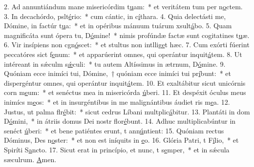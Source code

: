 2. Ad annuntiándum mane misericórdim t\uline{u}am:~* et veritátem tum per n\uline{o}ctem.
3. In decachórdo, pslt\uline{é}rio:~* cum cántic, in c\uline{í}thara.
4. Quia delectásti me, Dómine, in factúr t\uline{u}a:~* et in opéribus mánuum tuárum xsult\uline{á}bo.
5. Quam magnificáta sunt ópera tu, D\uline{ó}mine!~* nimis profúndæ factæ sunt cogitatines t\uline{u}æ.
6. Vir insípiens non cgn\uline{ó}scet:~* et stultus non intllig\uline{e}t hæc.
7. Cum exórti fúerint peccatóres sict f\uline{e}num:~* et apparúerint omnes, qui operántur inquit\uline{á}tem.
8. Ut intéreant in sǽculm s\uline{ǽ}culi:~* tu autem Altíssimus in ætrnum, D\uline{ó}mine.
9. Quóniam ecce inimíci tui, Dómine,~† quóniam ecce inimíci tui pr\uline{í}bunt:~* et dispergéntur omnes, qui operántur inquit\uline{á}tem.
10. Et exaltábitur sicut unicórnis corn m\uline{e}um:~* et senéctus mea in misericórda \uline{ú}beri.
11. Et despéxit óculus meus inimícs m\uline{e}os:~* et in insurgéntibus in me malignántibus áudiet ris m\uline{e}a.
12. Justus, ut palma flr\uline{é}bit:~* sicut cedrus Líbani multplic\uline{á}bitur.
13. Plantáti in dom D\uline{ó}mini,~* in átriis domus Dei nostr flor\uline{é}bunt.
14. Adhuc multiplicabúntur in senéct \uline{ú}beri:~* et bene patiéntes erunt, t ann\uline{ú}ntient:
15. Quóniam rectus Dóminus, Des n\uline{o}ster:~* et non est iníquits in \uline{e}o.
16. Glória Patri, t F\uline{í}lio,~* et Spiríti S\uline{a}ncto.
17. Sicut erat in princípio, et nunc, t s\uline{e}mper,~* et in sǽcula sæculrum. \uline{A}men.
